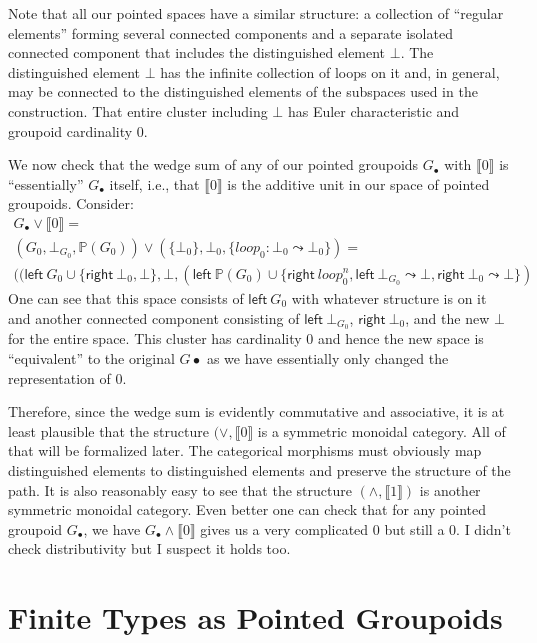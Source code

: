 \documentclass[11pt]{article}
\newcommand{\union}{\cup}
\renewcommand{\path}{\leadsto}
\newcommand{\paths}[1]{\mathds{P}(#1)}
\newcommand{\dt}[1]{\llbracket #1 \rrbracket}
\newcommand{\leftv}[1]{\textsf{left}~#1}
\newcommand{\rightv}[1]{\textsf{right}~#1}
\newcommand{\wedgesum}{\vee}
\newcommand{\smashproduct}{\wedge}
\begin{document}
Note that all our pointed spaces have a similar structure: a collection of
``regular elements'' forming several connected components and a separate
isolated connected component that includes the distinguished element
$\bot$. The distinguished element $\bot$ has the infinite collection of loops
on it and, in general, may be connected to the distinguished elements of the
subspaces used in the construction. That entire cluster including $\bot$ has
Euler characteristic and groupoid cardinality 0.

We now check that the wedge sum of any of our pointed groupoids $G_\bullet$
with $\dt{0}$ is ``essentially'' $G_\bullet$ itself, i.e., that $\dt{0}$ is
the additive unit in our space of pointed groupoids. Consider:
\[\begin{array}{l}
G_\bullet \wedgesum \dt{0} = \\
(G_0, \bot_{G_0}, \paths{G_0}) \wedgesum 
  (\{ \bot_0 \}, \bot_0, \{ \mathit{loop}_0 : \bot_0 \path \bot_0 \}) = \\
((\leftv{G_0} \union \{ \rightv{\bot_0}, \bot \}, 
 \bot,
 (\leftv{\paths{G_0}} \union \{ \rightv{\mathit{loop}^n_0} , 
 \leftv{\bot_{G_0}} \path \bot, \rightv{\bot_0} \path \bot \})
\end{array}\]
One can see that this space consists of $\leftv{G_0}$ with whatever structure
is on it and another connected component consisting of $\leftv{\bot_{G_0}}$,
$\rightv{\bot_0}$, and the new $\bot$ for the entire space. This cluster has
cardinality 0 and hence the new space is ``equivalent'' to the original
$G\bullet$ as we have essentially only changed the representation of 0. 

Therefore, since the wedge sum is evidently commutative and associative, it
is at least plausible that the structure $(\wedgesum, \dt{0}$ is a symmetric
monoidal category. All of that will be formalized later. The categorical
morphisms must obviously map distinguished elements to distinguished elements
and preserve the structure of the path. It is also reasonably easy to see
that the structure $(\smashproduct, \dt{1})$ is another symmetric monoidal
category. Even better one can check that for any pointed groupoid
$G_\bullet$, we have $G_\bullet \smashproduct \dt{0}$ gives us a very
complicated 0 but still a 0. I didn't check distributivity but I suspect it
holds too.

\section{Finite Types as Pointed Groupoids} 
\end{document}
